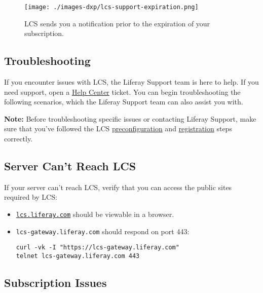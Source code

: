 \begin{figure}
\centering
\texttt{[image: ./images-dxp/lcs-support-expiration.png]}
\caption{LCS sends you a notification prior to the expiration of your
subscription.}
\end{figure}

\subsection{Troubleshooting}\label{troubleshooting}

If you encounter issues with LCS, the Liferay Support team is here to
help. If you need support, open a
\href{https://help.liferay.com/hc}{Help Center} ticket. You can begin
troubleshooting the following scenarios, which the Liferay Support team
can also assist you with.

\noindent\hrulefill

\textbf{Note:} Before troubleshooting specific issues or contacting
Liferay Support, make sure that you've followed the LCS
\href{/docs/7-0/deploy/-/knowledge_base/d/lcs-preconfiguration}{preconfiguration}
and
\href{/docs/7-0/deploy/-/knowledge_base/d/registering-your-dxp-server-with-lcs}{registration}
steps correctly.

\noindent\hrulefill

\subsection{Server Can't Reach LCS}\label{server-cant-reach-lcs}

If your server can't reach LCS, verify that you can access the public
sites required by LCS:

\begin{itemize}
\item
  \href{https://lcs.liferay.com/}{\texttt{lcs.liferay.com}} should be
  viewable in a browser.
\item
  \texttt{lcs-gateway.liferay.com} should respond on port 443:

\begin{verbatim}
curl -vk -I "https://lcs-gateway.liferay.com"
telnet lcs-gateway.liferay.com 443
\end{verbatim}
\end{itemize}

\subsection{Subscription Issues}\label{subscription-issues}

